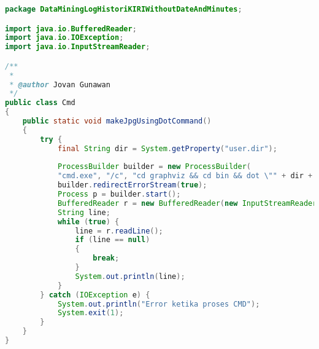 \begin{lstlisting}[language=Java,basicstyle=\tiny,caption=CMD.java]
package DataMiningLogHistoriKIRIWithoutDateAndMinutes;

import java.io.BufferedReader;
import java.io.IOException;
import java.io.InputStreamReader;

/**
 *
 * @author Jovan Gunawan
 */
public class Cmd 
{
    public static void makeJpgUsingDotCommand()
    {
        try {
            final String dir = System.getProperty("user.dir");
            
            ProcessBuilder builder = new ProcessBuilder(
            "cmd.exe", "/c", "cd graphviz && cd bin && dot \"" + dir + "\\tree.txt\" -o \"" + dir + "\\tree.jpg\" -Tjpg ");
            builder.redirectErrorStream(true);
            Process p = builder.start();
            BufferedReader r = new BufferedReader(new InputStreamReader(p.getInputStream()));
            String line;
            while (true) {
                line = r.readLine();
                if (line == null) 
                { 
                    break; 
                }
                System.out.println(line);
            }
        } catch (IOException e) {
            System.out.println("Error ketika proses CMD");
            System.exit(1);
        }
    }
}
\end{lstlisting}